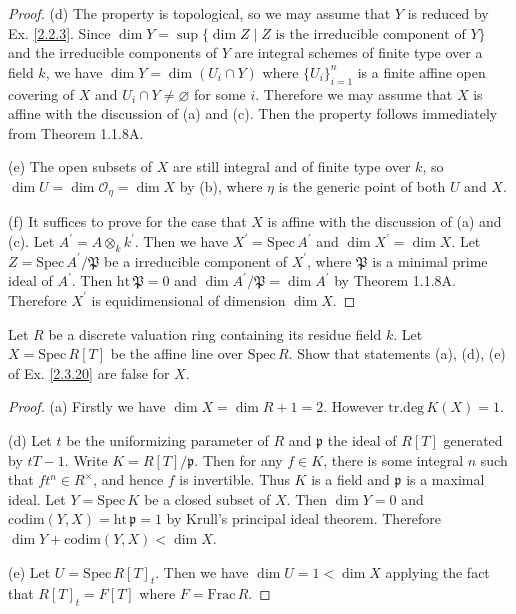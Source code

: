 \begin{proof}
	(d) The property is topological, so we may assume that $Y$ is reduced by Ex. \ref{2.2.3}. Since $\dim Y=\sup\{\dim Z\mid Z\text{ is the irreducible component of }Y\}$ and the irreducible components of $Y$ are integral schemes of finite type over a field $k$, we have $\dim Y=\dim(U_i\cap Y)$ where $\{U_i\}_{i=1}^n$ is a finite affine open covering of $X$ and $U_i\cap Y\neq\varnothing$ for some $i$. Therefore we may assume that $X$ is affine with the discussion of (a) and (c). Then the property follows immediately from Theorem 1.1.8A.
	
	(e) The open subsets of $X$ are still integral and of finite type over $k$, so $\dim U=\dim\mathcal{O}_{\eta}=\dim X$ by (b), where $\eta$ is the generic point of both $U$ and $X$.
	
	(f) It suffices to prove for the case that $X$ is affine with the discussion of (a) and (c). Let $A^{\prime}=A\otimes_kk^{\prime}$. Then we have $X^{\prime}=\mathrm{Spec}\,A^{\prime}$ and $\dim X^{\prime}=\dim X$. Let $Z=\mathrm{Spec}\,A^{\prime}/\mathfrak{P}$ be a irreducible component of $X^{\prime}$, where $\mathfrak{P}$ is a minimal prime ideal of $A^{\prime}$. Then $\mathrm{ht}\,\mathfrak{P}=0$ and $\dim A^{\prime}/\mathfrak{P}=\dim A^{\prime}$ by Theorem 1.1.8A. Therefore $X^{\prime}$ is equidimensional of dimension $\dim X$.
\end{proof}
\begin{exe}
	\label{2.3.21}
	Let $R$ be a discrete valuation ring containing its residue field $k$. Let $X= \mathrm{Spec}\,R [T]$ be the affine line over $\mathrm{Spec}\, R$. Show that statements (a), (d), (e) of Ex. \ref{2.3.20} are false for $X$.
\end{exe}
\begin{proof}
	(a) Firstly we have $\dim X=\dim R+1=2$. However $\mathrm{tr.deg}\,K(X)=1$.
	
	(d) Let $t$ be the uniformizing parameter of $R$ and $\mathfrak{p}$ the ideal of $R[T]$ generated by $tT-1$. Write $K=R[T]/\mathfrak{p}$. Then for any $f\in K$, there is some integral $n$ such that $ft^n\in R^{\times}$, and hence $f$ is invertible. Thus $K$ is a field and $\mathfrak{p}$ is a maximal ideal. Let $Y=\mathrm{Spec}\,K$ be a closed subset of $X$. Then $\dim Y=0$ and $\mathrm{codim}(Y,X)=\mathrm{ht}\,\mathfrak{p}=1$ by Krull's principal ideal theorem. Therefore $\dim Y+\mathrm{codim}(Y,X)<\dim X$.
	
	(e) Let $U=\mathrm{Spec}\,R[T]_t$. Then we have $\dim U=1<\dim X$ applying the fact that $R[T]_t=F[T]$ where $F=\mathrm{Frac}\,R$.
\end{proof}
